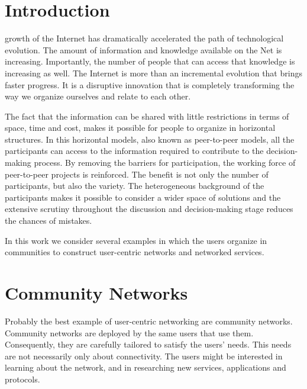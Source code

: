 \documentclass[journal]{IEEEtran}
\begin{document}
\section{Introduction}
% 
% 
% 
% 
 growth of the Internet has dramatically accelerated the path of technological evolution.
The amount of information and knowledge available on the Net is increasing.
Importantly,  the number of people that can access that knowledge is increasing as well.
The Internet is more than an incremental evolution that brings faster progress.
It is a disruptive innovation that is completely transforming the way we organize ourselves and relate to each other.

The fact that the information can be shared with little restrictions in terms of space, time and cost, makes it possible for people to organize in horizontal structures.
In this horizontal models, also known as peer-to-peer models, all the participants can access to the information required to contribute to the decision-making process.
By removing the barriers for participation, the working force of peer-to-peer projects is reinforced.
The benefit is not only the number of participants, but also the variety.
The heterogeneous background of the participants makes it possible to consider a wider space of solutions and the extensive scrutiny throughout the discussion and decision-making stage reduces the chances of mistakes.

In this work we consider several examples in which the users organize in communities to construct user-centric networks and networked services.



\section{Community Networks}
Probably the best example of user-centric networking are community networks.
Community networks are deployed by the same users that use them.
Consequently, they are carefully tailored to satisfy the users' needs.
This needs are not necessarily only about connectivity.
The users might be interested in learning about the network, and in researching  new services, applications and protocols.
\end{document}
